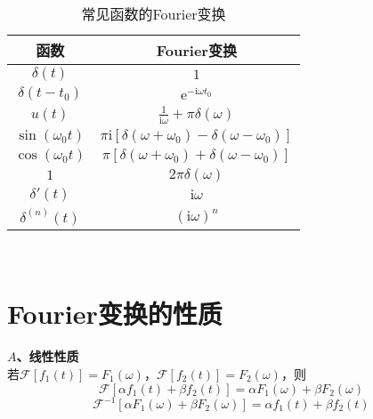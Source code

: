 \documentclass[12pt, a4paper, twoside]{ctexbook}
\begin{document}
\begin{table}[h]
    \centering
    \caption{常见函数的Fourier变换}\label{常见函数的Fourier变换}
    \begin{tabular}{cc}
        \toprule
        函数 & Fourier变换 \\
        \midrule
        $\delta\left(t\right)$          & $1$                                                           \\
        $\delta\left(t-t_0\right)$      & $\mathrm{e}^{-\mathrm{i}\omega t_0}$                           \\
        $u\left(t\right)$               & $\frac{1}{\mathrm{i}\omega}+\pi \delta\left(\omega\right)$    \\
        $\sin\left(\omega_0 t\right)$   & $\pi \mathrm{i}\left[\delta\left(\omega+\omega_0\right)-\delta\left(\omega-\omega_0\right)\right]$    \\
        $\cos\left(\omega_0 t\right)$   & $\pi \left[\delta\left(\omega+\omega_0\right)+\delta\left(\omega-\omega_0\right)\right]$              \\
        $1$                             & $2\pi \delta\left(\omega\right)$                                   \\
        $\delta '\left(t\right)$        & $\mathrm{i}\omega$                                            \\
        $\delta ^{\left(n\right)}\left(t\right)$      & $\left(\mathrm{i}\omega\right)^{n}$             \\
        \bottomrule
    \end{tabular}
\end{table}
~\\

\section{Fourier变换的性质}
\textbf{$A$、线性性质}\\
若$\mathscr{F}\left[f_1\left(t\right)\right]=F_1\left(\omega\right)$，$\mathscr{F}\left[f_2\left(t\right)\right]=F_2\left(\omega\right)$，则
$$
\mathscr{F}\left[ \alpha f_1\left( t \right) +\beta f_2\left( t \right) \right] =\alpha F_1\left( \omega \right) +\beta F_2\left( \omega \right) 
$$
$$
\mathscr{F}^{-1}\left[ \alpha F_1\left( \omega \right) +\beta F_2\left( \omega \right) \right] =\alpha f_1\left( t \right) +\beta f_2\left( t \right) 
$$
~\\
\end{document}
